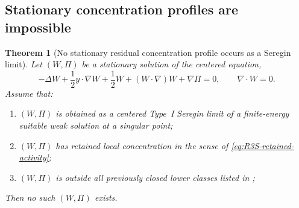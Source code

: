 \documentclass[11pt]{amsart}
\numberwithin{equation}{section}
\theoremstyle{plain}
\newtheorem{theorem}{Theorem}[section]
\theoremstyle{definition}
\theoremstyle{remark}
\begin{document}
\subsection{Stationary concentration profiles are impossible}

\begin{theorem}[No stationary residual concentration profile occurs as a Seregin limit]
\label{thm:R3S-no-active-stationary-carrier}
Let \((W,\Pi)\) be a stationary solution of the centered equation,
\begin{equation}\label{eq:R3S-stationary-centered}
   -\Delta W+\frac12 y\cdot\nabla W+\frac12 W
   +(W\cdot\nabla)W+\nabla\Pi=0,
   \qquad \nabla\cdot W=0 .
\end{equation}
Assume that:
\begin{enumerate}[label=(\roman*)]
   \item \((W,\Pi)\) is obtained as a centered Type~I Seregin limit of a
   finite-energy suitable weak solution at a singular point;
   \item \((W,\Pi)\) has retained local concentration in the sense of
   \eqref{eq:R3S-retained-activity};
   \item \((W,\Pi)\) is outside all previously closed lower classes listed in
   ;
\end{enumerate}
Then no such \((W,\Pi)\) exists.
\end{theorem}
\end{document}
